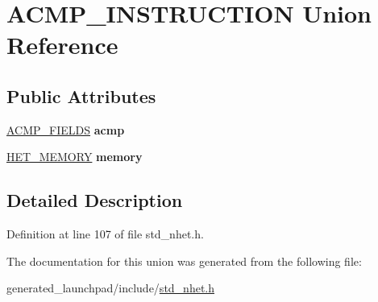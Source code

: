 \hypertarget{unionACMP__INSTRUCTION}{}\section{A\+C\+M\+P\+\_\+\+I\+N\+S\+T\+R\+U\+C\+T\+I\+ON Union Reference}
\label{unionACMP__INSTRUCTION}
\subsection*{Public Attributes}
\begin{DoxyCompactItemize}
\item 
\mbox{\label{unionACMP__INSTRUCTION_ad5b656c0bb15c42fe939f43cad8f96ad}} 
\mbox{\hyperlink{structacmp__format}{A\+C\+M\+P\+\_\+\+F\+I\+E\+L\+DS}} {\bfseries acmp}
\item 
\mbox{\label{unionACMP__INSTRUCTION_a6ca1e8cff3a1f588ac2ed643be8da9dd}} 
\mbox{\hyperlink{structmemory__format}{H\+E\+T\+\_\+\+M\+E\+M\+O\+RY}} {\bfseries memory}
\end{DoxyCompactItemize}


\subsection{Detailed Description}


Definition at line 107 of file std\+\_\+nhet.\+h.



The documentation for this union was generated from the following file\+:\begin{DoxyCompactItemize}
\item 
generated\+\_\+launchpad/include/\mbox{\hyperlink{std__nhet_8h}{std\+\_\+nhet.\+h}}\end{DoxyCompactItemize}
